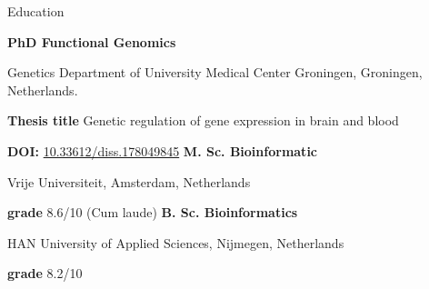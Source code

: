 \begin{rubric}{Education}

%
	\textbf{PhD Functional Genomics} \par
	Genetics Department of University Medical Center Groningen, Groningen, Netherlands. \par
	\textbf{Thesis title} Genetic regulation of gene expression in brain and blood \par
	\textbf{DOI:} \url{10.33612/diss.178049845}
%
%
	\textbf{M. Sc. Bioinformatic} \par
	Vrije Universiteit, Amsterdam, Netherlands \par
	\textbf{grade} 8.6/10 (Cum laude)
%
%
	\textbf{B. Sc. Bioinformatics} \par
	HAN University of Applied Sciences, Nijmegen, Netherlands \par
	\textbf{grade} 8.2/10
%
\end{rubric}

